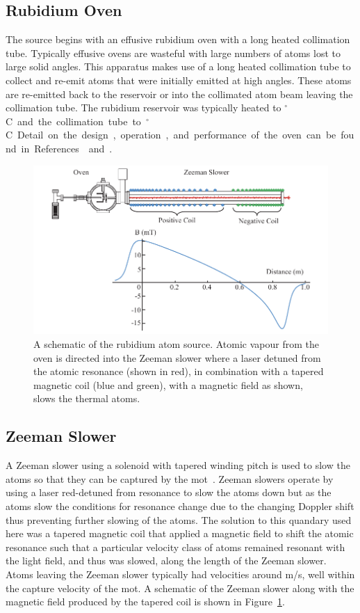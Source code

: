 \subsection{Rubidium Oven}
The source begins with an effusive rubidium oven with a long heated collimation tube.
Typically effusive ovens are wasteful with large numbers of atoms lost to large solid angles.
This apparatus makes use of a long heated collimation tube to collect and re-emit atoms that were initially emitted at high angles.
These atoms are re-emitted back to the reservoir or into the collimated atom beam leaving the collimation tube.
The rubidium reservoir was typically heated to \unit[80]{$^\circ$C} and the collimation tube to \unit[120]{$^\circ$C}.
Detail on the design, operation, and performance of the oven can be found in References~\cite{bell_slow_2010} and \cite{bell_cold_2011}.

\begin{figure}
    \center
    \includegraphics[width=145mm]{part2/Figs/ZeemanOven.pdf}
    \caption[A schematic of the rubidium atom source.]{A schematic of the rubidium atom source. Atomic vapour from the oven is directed into the Zeeman slower where a laser detuned from the atomic resonance (shown in red), in combination with a tapered magnetic coil (blue and green), with a magnetic field as shown, slows the thermal atoms.}
    \label{figure:zeemanoven}
\end{figure}

\subsection{Zeeman Slower}
A Zeeman slower using a solenoid with tapered winding pitch is used to slow the atoms so that they can be captured by the \gls{mot}~\cite{bell_slow_2010}.
Zeeman slowers operate by using a laser red-detuned from resonance to slow the atoms down but as the atoms slow the conditions for resonance change due to the changing Doppler shift thus preventing further slowing of the atoms.
The solution to this quandary used here was a tapered magnetic coil that applied a magnetic field to shift the atomic resonance such that a particular velocity class of atoms remained resonant with the light field, and thus was slowed, along the length of the Zeeman slower.
Atoms leaving the Zeeman slower typically had velocities around \unit[35]{m/s}, well within the capture velocity of the \gls{mot}.
A schematic of the Zeeman slower along with the magnetic field produced by the tapered coil is shown in Figure~\ref{figure:zeemanoven}.

